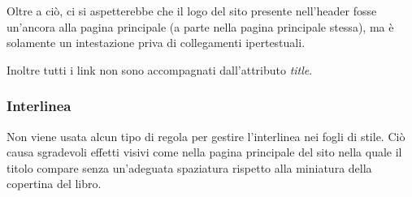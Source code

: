 Oltre a ciò, ci si aspetterebbe che il logo del sito presente nell'header fosse
un'ancora alla pagina principale (a parte nella pagina principale stessa), ma è
solamente un intestazione priva di collegamenti ipertestuali.

Inoltre tutti i link non sono accompagnati dall'attributo \textit{title}.

\subsubsection{Interlinea}\label{sec:user-interlinea}
Non viene usata alcun tipo di regola per gestire l'interlinea nei fogli di
stile. Ciò causa sgradevoli effetti visivi come nella pagina principale del
sito nella quale il titolo compare senza un'adeguata spaziatura rispetto alla
miniatura della copertina del libro.
